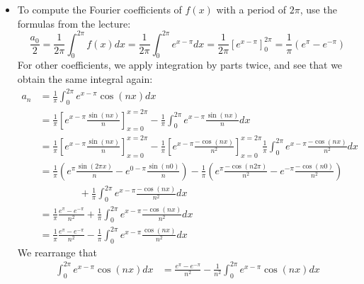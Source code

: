 \documentclass[11pt]{article}
\begin{document}
\begin{solution}     
    \begin{itemize}
    \item To compute the Fourier coefficients of $f(x)$ with a period of $2\pi$, use the formulas from the lecture:
    \[
        \frac{ a_0 }{2}
        = 
        \frac{1}{2\pi}\int_{0}^{2\pi} f(x) dx  = \frac{1}{2\pi}\int_{0}^{2\pi} e^{x-\pi} dx  = \frac{1}{2\pi}\left[ e^{x-\pi} \right]_{0}^{2\pi} = \frac{1}{\pi}\left(e^{\pi} - e^{-\pi}\right)
    \]
    For other coefficients, we apply integration by parts twice, and see that we obtain the same integral again:
    \begin{align*}
        a_n 
        &
        = 
        \frac{1}{\pi}
        \int_{0}^{2\pi} e^{x - \pi} \cos( n x) dx
        \\&
        =
        \frac{1}{\pi}
        \left[ e^{x - \pi} \frac{ \sin(n x) }{ n } \right]_{x=0}^{x=2\pi}
        -
        \frac{1}{\pi}
        \int_{0}^{2\pi} e^{x-\pi}\frac{ \sin( n x) }{ n } dx
        \\&
        =
        \frac{1}{\pi}
        \left[ e^{x - \pi} \frac{ \sin(n x) }{ n } \right]_{x=0}^{x=2\pi}
        -
        \frac{1}{\pi}
        \left[ e^{x - \pi} \frac{ -\cos(n x) }{ n^2 } \right]_{x=0}^{x=2\pi}
        \frac{1}{\pi}
        \int_{0}^{2\pi} e^{x-\pi}\frac{ -\cos(n x) }{ n^2 } dx
        \\&
        =
        \frac{1}{\pi}
        \left( e^{\pi} \frac{ \sin(2\pi x) }{ n } - e^{0 - \pi} \frac{ \sin(n 0) }{ n } \right)
        -
        \frac{1}{\pi}
        \left( e^{\pi} \frac{ -\cos(n 2\pi) }{ n^2 } - e^{- \pi} \frac{ -\cos(n 0) }{ n^2 } \right)
        \\&\qquad\qquad
        +
        \frac{1}{\pi}
        \int_{0}^{2\pi} e^{x-\pi}\frac{ -\cos(n x) }{ n^2 } dx
        \\&
        =
        \frac{1}{\pi}\frac{e^{\pi} - e^{-\pi}}{n^2}
        +
        \frac{1}{\pi}
        \int_{0}^{2\pi} e^{x-\pi}\frac{ -\cos(n x) }{ n^2 } dx
        \\&
        =
        \frac{1}{\pi}\frac{e^{\pi} - e^{-\pi}}{n^2}
        -
        \frac{1}{\pi}
        \int_{0}^{2\pi} e^{x-\pi}\frac{ \cos(n x) }{ n^2 } dx
        \end{align*}
        We rearrange that 
        \begin{align*}
            \int_{0}^{2\pi} e^{x-\pi} \cos(n x) dx
            &=
            \frac{e^{\pi} - e^{-\pi}}{ n^2}
            -
            \frac{1}{n^2}
            \int_{0}^{2\pi} e^{x-\pi} \cos(n x) dx

\end{align*}
\end{itemize}
\end{solution}
\end{document}
